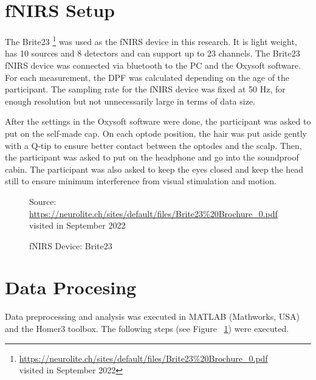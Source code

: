 \newpage 
\section {fNIRS Setup}
The Brite23 \footnote {\url{https://neurolite.ch/sites/default/files/Brite23\%20Brochure_0.pdf} \\ visited in September 2022} was used as the fNIRS device in this research. It is light weight, has 10 sources and 8 detectors and can support up to 23 channels. The Brite23 fNIRS device was connected via bluetooth to the PC and the Oxysoft software. For each measurement, the DPF was calculated depending on the age of the participant. The sampling rate for the fNIRS device was fixed at 50 Hz, for enough resolution but not unnecessarily large in terms of data size.

After the settings in the Oxysoft software were done, the participant was asked to put on the self-made cap. On each optode position, the hair was put aside gently with a Q-tip to ensure better contact between the optodes and the scalp. Then, the participant was asked to put on the headphone and go into the soundproof cabin. The participant was also asked to keep the eyes closed and keep the head still to ensure minimum interference from visual stimulation and motion.

\begin{figure}[H]
  \centering
           {Source: \url{https://neurolite.ch/sites/default/files/Brite23\%20Brochure_0.pdf}\\ visited in September 2022}
     \caption{fNIRS Device: Brite23}
  \label{fig:flowchart}
\end{figure}


\section {Data Procesing}
Data preprocessing and analysis was executed in MATLAB (Mathworks, USA) and the Homer3 toolbox. The following steps (see Figure ~\ref{fig:flowchart}) were executed.


